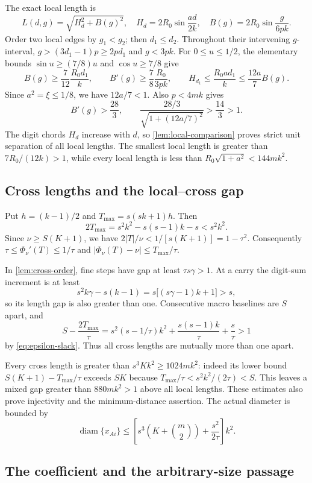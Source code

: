 \documentclass[11pt]{article}
\numberwithin{equation}{section}
\theoremstyle{definition}\newtheorem{definition}[theorem]{Definition}
\theoremstyle{remark}\newtheorem{remark}[theorem]{Remark}
\DeclareMathOperator{\diam}{diam}\DeclareMathOperator{\diag}{diag}
\begin{document}
The exact local length is
\[
 L(d,g)=\sqrt{H_d^2+B(g)^2},\quad
 H_d=2R_0\sin\frac{ad}{2k},\quad B(g)=2R_0\sin\frac{g}{6pk}.
\]
Order two local edges by $g_1<g_2$; then $d_1\le d_2$. Throughout their
intervening $g$-interval, $g>(3d_1-1)p\ge2pd_1$ and $g<3pk$.
For $0\le u\le1/2$, the elementary bounds $\sin u\ge(7/8)u$ and
$\cos u\ge7/8$ give
\[
 B(g)\ge\frac7{12}\frac{R_0d_1}{k},\qquad
 B'(g)\ge\frac78\frac{R_0}{3pk},\qquad
 H_{d_1}\le\frac{R_0ad_1}{k}\le\frac{12a}{7}B(g).
\]
Since $a^2=\xi\le1/8$, we have $12a/7<1$. Also $p<4mk$ gives
\[
 B'(g)>\frac{28}{3},\qquad
 \frac{28/3}{\sqrt{1+(12a/7)^2}}>\frac{14}{3}>1.
\]
The digit chords $H_d$ increase with $d$, so \cref{lem:local-comparison}
proves strict unit separation of all local lengths.
The smallest local length is greater than $7R_0/(12k)>1$, while every
local length is less than $R_0\sqrt{1+a^2}<144mk^2$.

\subsection{Cross lengths and the local--cross gap}

Put $h=(k-1)/2$ and $T_{\max}=s(sk+1)h$. Then
\[
 2T_{\max}=s^2k^2-s(s-1)k-s<s^2k^2.
\]
Since $\nu\ge S(K+1)$, we have
$2|T|/\nu<1/[s(K+1)]=1-\tau^2$. Consequently
$\tau\le\Phi_\nu'(T)\le1/\tau$ and
$|\Phi_\nu(T)-\nu|\le T_{\max}/\tau$.

In \cref{lem:cross-order}, fine steps have gap at least $\tau s\gamma>1$.
At a carry the digit-sum increment is at least
\[
 s^2k\gamma-s(k-1)=s\bigl[(s\gamma-1)k+1\bigr]>s,
\]
so its length gap is also greater than one. Consecutive macro baselines
are $S$ apart, and
\[
 S-\frac{2T_{\max}}\tau
 =s^2(s-1/\tau)k^2+\frac{s(s-1)k}\tau+\frac s\tau>1
\]
by \eqref{eq:epsilon-slack}. Thus all cross lengths are mutually more
than one apart.

Every cross length is greater than $s^3Kk^2\ge1024mk^2$:
indeed its lower bound $S(K+1)-T_{\max}/\tau$ exceeds $SK$ because
$T_{\max}/\tau<s^2k^2/(2\tau)<S$. This leaves a mixed gap greater than
$880mk^2>1$ above all local lengths. These estimates also prove injectivity
and the minimum-distance assertion. The actual diameter is bounded by
\begin{equation}\label{eq:epsilon-diameter}
 \diam\{x_{Ai}\}\le
 \left[s^3\left(K+\binom m2\right)+\frac{s^2}{2\tau}\right]k^2.
\end{equation}



\subsection{The coefficient and the arbitrary-size passage}
\end{document}
